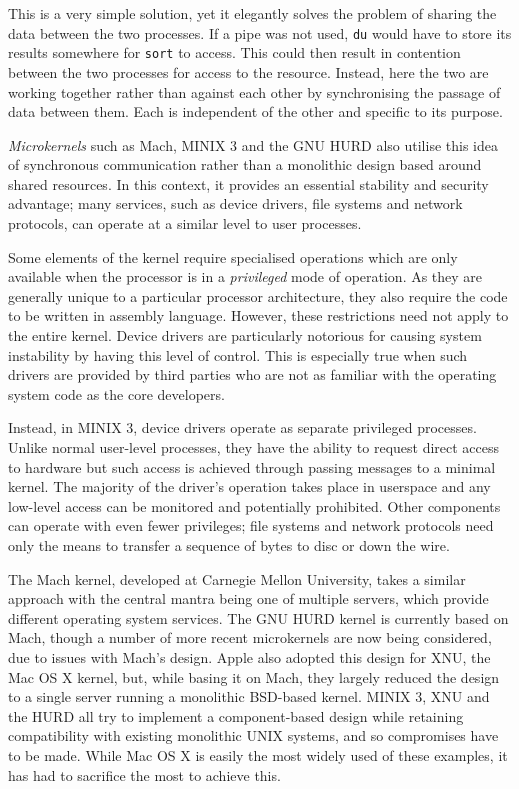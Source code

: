 This is a very simple solution, yet it elegantly solves the problem of
sharing the data between the two processes.  If a pipe was not used,
\texttt{du} would have to store its results somewhere for
\texttt{sort} to access.  This could then result in contention between
the two processes for access to the resource.  Instead, here the two
are working together rather than against each other by synchronising
the passage of data between them.  Each is independent of the other
and specific to its purpose.

\emph{Microkernels} such as Mach\cite{mach}, MINIX 3\cite{minix3} and
the GNU HURD\cite{hurd} also utilise this idea of synchronous
communication rather than a monolithic design based around shared
resources.  In this context, it provides an essential stability and
security advantage; many services, such as device drivers, file systems and
network protocols, can operate at a similar level to user processes.

Some elements of the kernel require specialised operations which are
only available when the processor is in a \emph{privileged} mode of
operation.  As they are generally unique to a particular processor
architecture, they also require the code to be written in assembly
language.  However, these restrictions need not apply to the entire
kernel.  Device drivers are particularly notorious for causing system
instability by having this level of control.  This is especially true
when such drivers are provided by third parties who are not as
familiar with the operating system code as the core developers.

Instead, in MINIX 3, device drivers operate as separate privileged
processes.  Unlike normal user-level processes, they have the ability
to request direct access to hardware but such access is achieved
through passing messages to a minimal kernel.  The majority of the
driver's operation takes place in userspace and any low-level access
can be monitored and potentially prohibited.  Other components can
operate with even fewer privileges; file systems and network protocols
need only the means to transfer a sequence of bytes to disc or down
the wire.

The Mach kernel, developed at Carnegie Mellon University, takes a
similar approach with the central mantra being one of multiple
servers, which provide different operating system services.  The GNU
HURD kernel is currently based on Mach, though a number of more recent
microkernels are now being considered, due to issues with Mach's
design\cite{hurd:critique}.  Apple also adopted this design for XNU,
the Mac OS X kernel, but, while basing it on Mach, they largely
reduced the design to a single server running a monolithic BSD-based
kernel.  MINIX 3, XNU and the HURD all try to implement a
component-based design while retaining compatibility with existing
monolithic UNIX systems, and so compromises have to be made.  While
Mac OS X is easily the most widely used of these examples, it has had
to sacrifice the most to achieve this.

